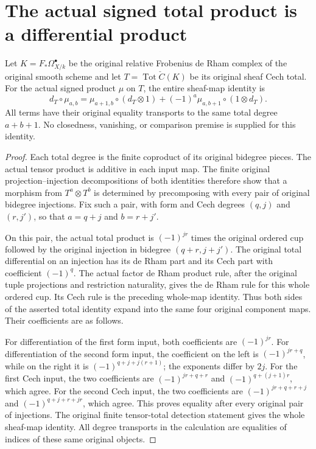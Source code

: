\section{The actual signed total product is a differential product}

\begin{lemma}
\label{lem:di-cech-total-cup-leibniz}
\leanok
{}
Let $K=F_*\Omega^\bullet_{X/k}$ be the original relative Frobenius
de Rham complex of the original smooth scheme and let
$T=\operatorname{Tot}\check C(K)$ be its original sheaf Cech total.
For the actual signed product $\mu$ on $T$, the entire sheaf-map
identity is
\[
 d_T\circ\mu_{a,b}=
 \mu_{a+1,b}\circ(d_T\otimes1)
 +(-1)^a\mu_{a,b+1}\circ(1\otimes d_T).
\]
All terms have their original equality transports to the same total
degree $a+b+1$. No closedness, vanishing, or comparison premise is
supplied for this identity.
\end{lemma}
\begin{proof}
\leanok
Each total degree is the finite coproduct of its original bidegree
pieces. The actual tensor product is additive in each input map.
The finite original projection--injection decompositions of both
identities therefore show that a morphism from $T^a\otimes T^b$
is determined by precomposing with every pair of original bidegree
injections. Fix such a pair, with form and Cech degrees $(q,j)$ and
$(r,j')$, so that $a=q+j$ and $b=r+j'$.

On this pair, the actual total product is
$(-1)^{jr}$ times the original ordered cup followed by the original
injection in bidegree $(q+r,j+j')$. The original total differential
on an injection has its de Rham part and its Cech part with
coefficient $(-1)^q$. The actual factor de Rham product rule, after
the original tuple projections and restriction naturality, gives
the de Rham rule for this whole ordered cup. Its Cech rule is the
preceding whole-map identity. Thus both sides of the asserted
total identity expand into the same four original component maps.
Their coefficients are as follows.

For differentiation of the first form input, both coefficients
are $(-1)^{jr}$. For differentiation of the second form input,
the coefficient on the left is $(-1)^{jr+q}$, while on the right
it is $(-1)^{q+j+j(r+1)}$; the exponents differ by $2j$.
For the first Cech input, the two coefficients are
$(-1)^{jr+q+r}$ and $(-1)^{q+(j+1)r}$, which agree.
For the second Cech input, the two coefficients are
$(-1)^{jr+q+r+j}$ and $(-1)^{q+j+r+jr}$, which agree.
This proves equality after every original pair of injections.
The original finite tensor-total detection statement gives the
whole sheaf-map identity. All degree transports in the calculation
are equalities of indices of these same original objects.
\end{proof}

